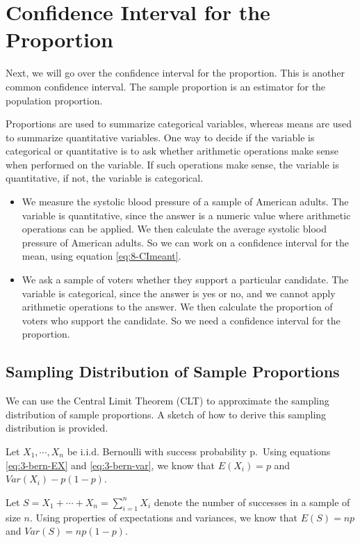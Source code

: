 \documentclass[
]{book}
\begin{document}
\section{Confidence Interval for the Proportion}\label{confidence-interval-for-the-proportion}

Next, we will go over the confidence interval for the proportion. This is another common confidence interval. The sample proportion is an estimator for the population proportion.

Proportions are used to summarize categorical variables, whereas means are used to summarize quantitative variables. One way to decide if the variable is categorical or quantitative is to ask whether arithmetic operations make sense when performed on the variable. If such operations make sense, the variable is quantitative, if not, the variable is categorical.

\begin{itemize}
\item
  We measure the systolic blood pressure of a sample of American adults. The variable is quantitative, since the answer is a numeric value where arithmetic operations can be applied. We then calculate the average systolic blood pressure of American adults. So we can work on a confidence interval for the mean, using equation \eqref{eq:8-CImeant}.
\item
  We ask a sample of voters whether they support a particular candidate. The variable is categorical, since the answer is yes or no, and we cannot apply arithmetic operations to the answer. We then calculate the proportion of voters who support the candidate. So we need a confidence interval for the proportion.
\end{itemize}

\subsection{Sampling Distribution of Sample Proportions}\label{sampling-distribution-of-sample-proportions}

We can use the Central Limit Theorem (CLT) to approximate the sampling distribution of sample proportions. A sketch of how to derive this sampling distribution is provided.

Let \(X_1, \cdots, X_n\) be i.i.d. Bernoulli with success probability p.~Using equations \eqref{eq:3-bern-EX} and \eqref{eq:3-bern-var}, we know that \(E(X_i) = p\) and \(Var(X_i) - p(1-p)\).

Let \(S = X_1 + \cdots + X_n = \sum_{i=1}^n X_i\) denote the number of successes in a sample of size \(n\). Using properties of expectations and variances, we know that \(E(S) = np\) and \(Var(S) = np(1-p)\).
\end{document}
